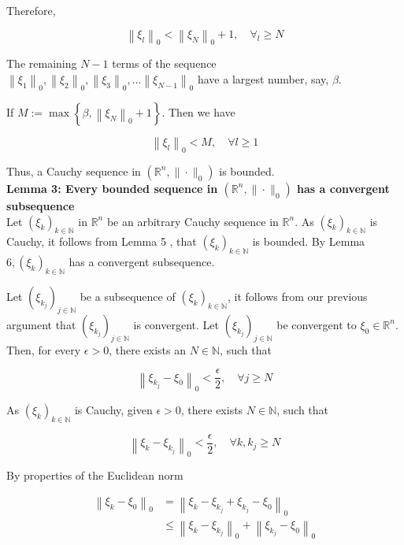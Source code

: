\documentclass{article}
\begin{document}
Therefore,

$$
\left\|\xi_{l}\right\|_{0}<\left\|\xi_{N}\right\|_{0}+1, \quad \forall_l \geq N
$$

The remaining $N-1$ terms of the sequence $\left\|\xi_{1}\right\|_{0},\left\|\xi_{2}\right\|_{0},\left\|\xi_{3}\right\|_{0}, \ldots\left\|\xi_{N-1}\right\|_{0}$ have a largest number, say, $\beta$.

If $M:=\max \left\{\beta,\left\|\xi_{N}\right\|_{0}+1\right\}$. Then we have

$$
\left\|\xi_{l}\right\|_{0}<M, \quad \forall l \geq 1
$$

Thus, a Cauchy sequence in $\left(\mathbb{R}^{n},\|\cdot\|_{0}\right)$ is bounded.\\





\textbf{Lemma 3: Every bounded sequence in $\left(\mathbb{R}^{n},\|\cdot\|_{0}\right)$ has a convergent subsequence}\\

Let $\left(\xi_{k}\right)_{k \in \mathbb{N}}$ in $\mathbb{R}^{n}$ be an arbitrary Cauchy sequence in $\mathbb{R}^{n}$. As $\left(\xi_{k}\right)_{k \in \mathbb{N}}$ is Cauchy, it follows from Lemma 5 , that $\left(\xi_{k}\right)_{k \in \mathbb{N}}$ is bounded. By Lemma $6,\left(\xi_{k}\right)_{k \in \mathbb{N}}$ has a convergent subsequence.

Let $\left(\xi_{k_{j}}\right)_{j \in \mathbb{N}}$ be a subsequence of $\left(\xi_{k}\right)_{k \in \mathbb{N}}$, it follows from our previous argument that $\left(\xi_{k_{j}}\right)_{j \in \mathbb{N}}$ is convergent. Let $\left(\xi_{k_{j}}\right)_{j \in \mathbb{N}}$ be convergent to $\xi_{0} \in \mathbb{R}^{n}$. Then, for every $\epsilon>0$, there exists an $N \in \mathbb{N}$, such that

$$
\left\|\xi_{k_{j}}-\xi_{0}\right\|_{0}<\frac{\epsilon}{2}, \quad \forall j \geq N
$$

As $\left(\xi_{k}\right)_{k \in \mathbb{N}}$ is Cauchy, given $\epsilon>0$, there exists $N \in \mathbb{N}$, such that

$$
\left\|\xi_{k}-\xi_{k_{j}}\right\|_{0}<\frac{\epsilon}{2}, \quad \forall k, k_{j} \geq N
$$

By properties of the Euclidean norm

$$
\begin{aligned}
\left\|\xi_{k}-\xi_{0}\right\|_{0} & =\left\|\xi_{k}-\xi_{k_{j}}+\xi_{k_{j}}-\xi_{0}\right\|_{0} \\
& \leq\left\|\xi_{k}-\xi_{k_{j}}\right\|_{0}+\left\|\xi_{k_{j}}-\xi_{0}\right\|_{0}
\end{aligned}
$$
\end{document}
